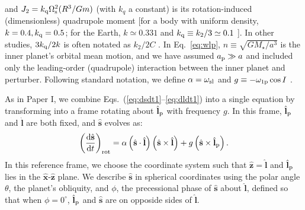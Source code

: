 \documentclass[
        fleqn,
        usenatbib,
        referee,
    ]{mnras}
\newcommand*{\rd}[2]{\frac{\mathrm{d}#1}{\mathrm{d}#2}}
\newcommand*{\p}[1]{\left(#1\right)}
\newcommand*{\uv}[1]{\hat{\boldsymbol{\mathbf{#1}}}}
\begin{document}
and $J_2 = k_{\rm q}\Omega_{\rm s}^2 (R^3/Gm)$ (with $k_{q}$ a constant) is its
rotation-induced (dimensionless) quadrupole moment [for a body with uniform
density, $k=0.4, k_{\rm q}=0.5$; for the Earth, $k \simeq 0.331$ and $k_{\rm q}
\equiv k_2 / 3 \simeq 0.1$ \citep[e.g.][]{groten2004fundamental,
lainey2016quantification}]. In other studies, $3k_{\rm q} / 2 k$ is often
notated as $k_2 / 2C$ \citep[e.g.][]{millholland_disk}. In Eq.~\eqref{eq:wlp},
$n \equiv \sqrt{GM_\star/a^3}$ is the inner planet's orbital mean motion,  and
we have assumed $a_{\rm p}\gg a$ and included only the leading-order
(quadrupole) interaction between the inner planet and perturber. Following
standard notation, we define $\alpha = \omega_{\rm sl}$ and $g \equiv
-\omega_{\rm 1p} \cos I$ \citep[e.g.][]{colombo1966}.

As in Paper I, we combine Eqs.~(\ref{eq:dsdt1}--\ref{eq:dldt1}) into a
single equation by transforming into a frame rotating about $\uv{l}_{\rm p}$
with frequency $g$. In this frame, $\uv{l}_{\rm p}$ and $\uv{l}$ are both fixed,
and $\uv{s}$ evolves as:
\begin{equation}
    \p{\rd{\uv{s}}{t}}_{\rm rot}
        = \alpha\p{\uv{s} \cdot \uv{l}}\p{\uv{s} \times \uv{l}}
            + g\p{\uv{s} \times \uv{l}_{\rm p}}. \label{eq:dsdt_rot}
\end{equation}
In this reference frame, we choose the coordinate system such that $\uv{z} =
\uv{l}$ and $\uv{l}_{\rm p}$ lies in the $\uv{x}$-$\uv{z}$ plane. We describe
$\uv{s}$ in spherical coordinates using the polar angle $\theta$, the planet's
obliquity, and $\phi$, the precessional phase of $\uv{s}$ about $\uv{l}$,
defined so that when $\phi = 0^\circ$, $\uv{l}_{\rm p}$ and $\uv{s}$ are on
opposide sides of $\uv{l}$.
\end{document}
